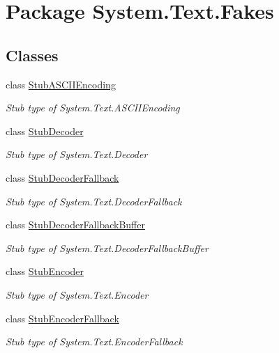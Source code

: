 \hypertarget{namespace_system_1_1_text_1_1_fakes}{\section{Package System.\-Text.\-Fakes}
\label{namespace_system_1_1_text_1_1_fakes}
}
\subsection*{Classes}
\begin{DoxyCompactItemize}
\item 
class \hyperlink{class_system_1_1_text_1_1_fakes_1_1_stub_a_s_c_i_i_encoding}{Stub\-A\-S\-C\-I\-I\-Encoding}
\begin{DoxyCompactList}\small\item\em Stub type of System.\-Text.\-A\-S\-C\-I\-I\-Encoding\end{DoxyCompactList}\item 
class \hyperlink{class_system_1_1_text_1_1_fakes_1_1_stub_decoder}{Stub\-Decoder}
\begin{DoxyCompactList}\small\item\em Stub type of System.\-Text.\-Decoder\end{DoxyCompactList}\item 
class \hyperlink{class_system_1_1_text_1_1_fakes_1_1_stub_decoder_fallback}{Stub\-Decoder\-Fallback}
\begin{DoxyCompactList}\small\item\em Stub type of System.\-Text.\-Decoder\-Fallback\end{DoxyCompactList}\item 
class \hyperlink{class_system_1_1_text_1_1_fakes_1_1_stub_decoder_fallback_buffer}{Stub\-Decoder\-Fallback\-Buffer}
\begin{DoxyCompactList}\small\item\em Stub type of System.\-Text.\-Decoder\-Fallback\-Buffer\end{DoxyCompactList}\item 
class \hyperlink{class_system_1_1_text_1_1_fakes_1_1_stub_encoder}{Stub\-Encoder}
\begin{DoxyCompactList}\small\item\em Stub type of System.\-Text.\-Encoder\end{DoxyCompactList}\item 
class \hyperlink{class_system_1_1_text_1_1_fakes_1_1_stub_encoder_fallback}{Stub\-Encoder\-Fallback}
\begin{DoxyCompactList}\small\item\em Stub type of System.\-Text.\-Encoder\-Fallback\end{DoxyCompactList}\item 

\end{DoxyCompactItemize}
